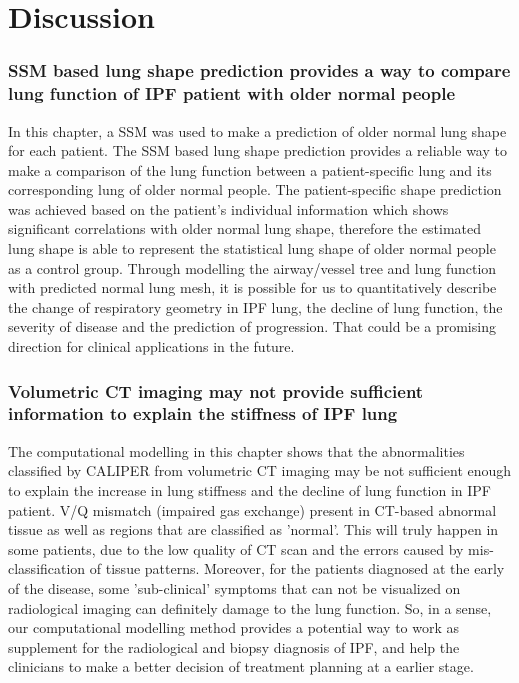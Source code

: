 \section{Discussion}

\subsubsection{SSM based lung shape prediction provides a way to compare lung function of IPF patient with older normal people}
In this chapter, a SSM was used to make a prediction of older normal lung shape for each patient. The SSM based lung shape prediction provides a reliable way to make a comparison of the lung function between a patient-specific lung and its corresponding lung of older normal people. The patient-specific shape prediction was achieved based on the patient's individual information which shows significant correlations with older normal lung shape, therefore the estimated lung shape is able to represent the statistical lung shape of older normal people as a control group. Through modelling the airway/vessel tree and lung function with predicted normal lung mesh, it is possible for us to quantitatively describe the change of respiratory geometry in IPF lung, the decline of lung function, the severity of disease and the prediction of progression. That could be a promising direction for clinical applications in the future.

\subsubsection{Volumetric CT imaging may not provide sufficient information to explain the stiffness of IPF lung}
The computational modelling in this chapter shows that the abnormalities classified by CALIPER from volumetric CT imaging may be not sufficient enough to explain the increase in lung stiffness and the decline of lung function in IPF patient. V/Q mismatch (impaired gas exchange) present in CT-based abnormal tissue as well as regions that are classified as 'normal'. This will truly happen in some patients, due to the low quality of CT scan and the errors caused by mis-classification of tissue patterns. Moreover, for the patients diagnosed at the early of the disease, some 'sub-clinical' symptoms that can not be visualized on radiological imaging can definitely damage to the lung function. So, in a sense, our computational modelling method provides a potential way to work as supplement for the radiological and biopsy diagnosis of IPF, and help the clinicians to make a better decision of treatment planning at a earlier stage. 

